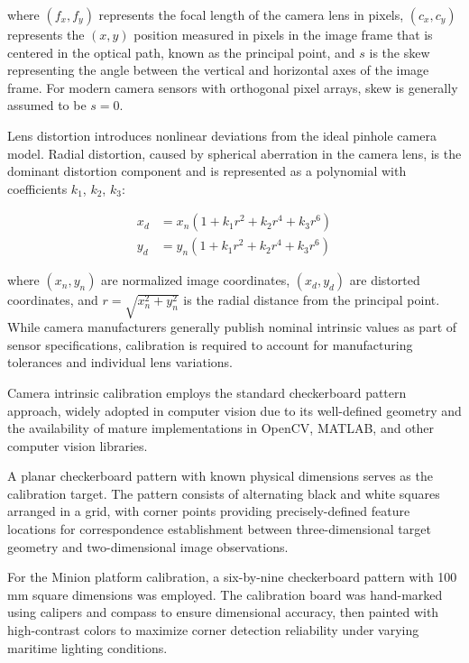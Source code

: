 \documentclass{erauthesis}
\begin{document}
where $(f_x, f_y)$ represents the focal length of the camera lens in pixels, $(c_x, c_y)$ represents the $(x, y)$ position measured in pixels in the image frame that is centered in the optical path, known as the principal point, and $s$ is the skew representing the angle between the vertical and horizontal axes of the image frame.
For modern camera sensors with orthogonal pixel arrays, skew is generally assumed to be $s = 0$.

Lens distortion introduces nonlinear deviations from the ideal pinhole camera model.
Radial distortion, caused by spherical aberration in the camera lens, is the dominant distortion component and is represented as a polynomial with coefficients $k_1$, $k_2$, $k_3$:

\begin{equation} \label{eq:spherical_distortion}
\begin{split}
x_d &= x_n(1 + k_1 r^2 + k_2 r^4 + k_3 r^6) \\
y_d &= y_n(1 + k_1 r^2 + k_2 r^4 + k_3 r^6)
\end{split}
\end{equation}

where $(x_n, y_n)$ are normalized image coordinates, $(x_d, y_d)$ are distorted coordinates, and $r = \sqrt{x_n^2 + y_n^2}$ is the radial distance from the principal point.
While camera manufacturers generally publish nominal intrinsic values as part of sensor specifications, calibration is required to account for manufacturing tolerances and individual lens variations.


Camera intrinsic calibration employs the standard checkerboard pattern approach, widely adopted in computer vision due to its well-defined geometry and the availability of mature implementations in OpenCV, MATLAB, and other computer vision libraries.


A planar checkerboard pattern with known physical dimensions serves as the calibration target.
The pattern consists of alternating black and white squares arranged in a grid, with corner points providing precisely-defined feature locations for correspondence establishment between three-dimensional target geometry and two-dimensional image observations.

For the Minion platform calibration, a six-by-nine checkerboard pattern with 100 mm square dimensions was employed.
The calibration board was hand-marked using calipers and compass to ensure dimensional accuracy, then painted with high-contrast colors to maximize corner detection reliability under varying maritime lighting conditions.
\end{document}
